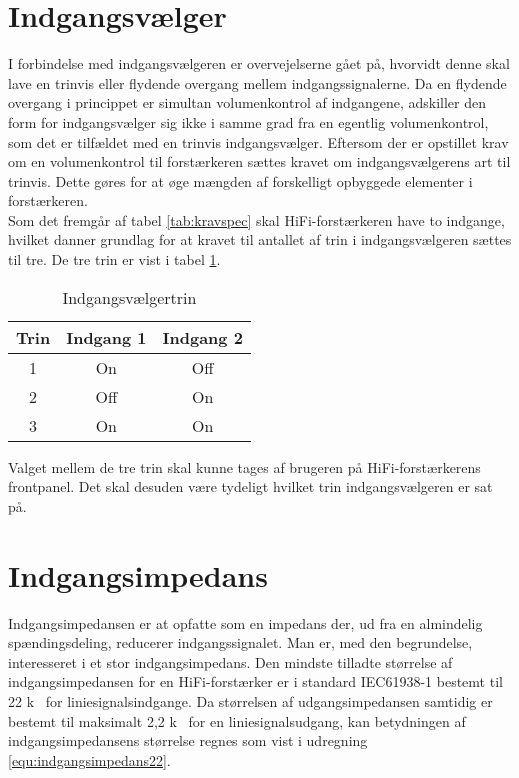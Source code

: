 \section{Indgangsvælger}
\label{krav_indgangsvaelger}
I forbindelse med indgangsvælgeren er overvejelserne gået på, hvorvidt denne skal lave en trinvis eller flydende overgang mellem indgangssignalerne. Da en flydende overgang i princippet er simultan volumenkontrol af indgangene, adskiller den form for indgangsvælger sig ikke i samme grad fra en egentlig volumenkontrol, som det er tilfældet med en trinvis indgangsvælger. Eftersom der er opstillet krav om en volumenkontrol til forstærkeren sættes kravet om indgangsvælgerens art til trinvis. Dette gøres for at øge mængden af forskelligt opbyggede elementer i forstærkeren. \\
Som det fremgår af tabel \ref{tab:kravspec} skal HiFi-forstærkeren have to indgange, hvilket danner grundlag for at kravet til antallet af trin i indgangsvælgeren sættes til tre. De tre trin er vist i tabel \ref{tab:indgangsvaelgertrin}.

\begin{table}[h]
\centering
\begin{tabular}{c|c|c}
\hline\hline
Trin & Indgang 1 & Indgang 2 \\
\hline\hline
1 & On & Off \\
2 & Off & On \\
3 & On & On \\
\hline\hline
\end{tabular}
\caption{Indgangsvælgertrin}
\label{tab:indgangsvaelgertrin}
\end{table}

Valget mellem de tre trin skal kunne tages af brugeren på HiFi-forstærkerens frontpanel. Det skal desuden være tydeligt hvilket trin indgangsvælgeren er sat på.

\section{Indgangsimpedans}
\label{krav_indgangsimpedans}
Indgangsimpedansen er at opfatte som en impedans der, ud fra en almindelig spændingsdeling, reducerer indgangssignalet. Man er, med den begrundelse, interesseret i et stor indgangsimpedans. Den mindste tilladte størrelse af indgangsimpedansen for en HiFi-forstærker er i standard IEC61938-1 bestemt til 22 k\ohm~ for liniesignalsindgange. Da størrelsen af udgangsimpedansen samtidig er bestemt til maksimalt 2,2 k\ohm~ for en liniesignalsudgang, kan betydningen af indgangsimpedansens størrelse regnes som vist i udregning \ref{equ:indgangsimpedans22}. 

